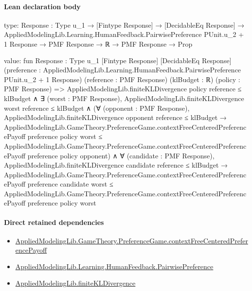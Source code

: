 \documentclass[10pt]{article}
\begin{document}
\paragraph{Lean declaration body}
\begin{ReviewVerbatim}
type:
{Response : Type u_1} →
  [Fintype Response] →
    [DecidableEq Response] →
      AppliedModelingLib.Learning.HumanFeedback.PairwisePreference PUnit.{u_2 + 1} Response →
        PMF Response → ℝ → PMF Response → Prop

value:
fun {Response : Type u_1} [Fintype Response] [DecidableEq Response]
    (preference : AppliedModelingLib.Learning.HumanFeedback.PairwisePreference PUnit.{u_2 + 1} Response)
    (reference : PMF Response) (klBudget : ℝ) (policy : PMF Response) =>
  AppliedModelingLib.finiteKLDivergence policy reference ≤ klBudget ∧
    ∃ (worst : PMF Response),
      AppliedModelingLib.finiteKLDivergence worst reference ≤ klBudget ∧
        (∀ (opponent : PMF Response),
            AppliedModelingLib.finiteKLDivergence opponent reference ≤ klBudget →
              AppliedModelingLib.GameTheory.PreferenceGame.contextFreeCenteredPreferencePayoff preference policy worst ≤
                AppliedModelingLib.GameTheory.PreferenceGame.contextFreeCenteredPreferencePayoff preference policy
                  opponent) ∧
          ∀ (candidate : PMF Response),
            AppliedModelingLib.finiteKLDivergence candidate reference ≤ klBudget →
              AppliedModelingLib.GameTheory.PreferenceGame.contextFreeCenteredPreferencePayoff preference candidate
                  worst ≤
                AppliedModelingLib.GameTheory.PreferenceGame.contextFreeCenteredPreferencePayoff preference policy worst
\end{ReviewVerbatim}

\paragraph{Direct retained dependencies}
\begin{itemize}\raggedright
\item \hyperlink{governing-declaration-44fb06319bbd7683}{Applied\allowbreak{}Modeling\allowbreak{}Lib.\allowbreak{}Game\allowbreak{}Theory.\allowbreak{}Preference\allowbreak{}Game.\allowbreak{}context\allowbreak{}Free\allowbreak{}Centered\allowbreak{}Preference\allowbreak{}Payoff}
\item \hyperlink{library-prerequisite-7e2db20cf087d9ba}{Applied\allowbreak{}Modeling\allowbreak{}Lib.\allowbreak{}Learning.\allowbreak{}Human\allowbreak{}Feedback.\allowbreak{}Pairwise\allowbreak{}Preference}
\item \hyperlink{library-prerequisite-d3573881ae45d4c6}{Applied\allowbreak{}Modeling\allowbreak{}Lib.\allowbreak{}finite\allowbreak{}KL\allowbreak{}Divergence}
\end{itemize}
\hypertarget{governing-declaration-2b862fbe69d5aa04}{}
\end{document}
